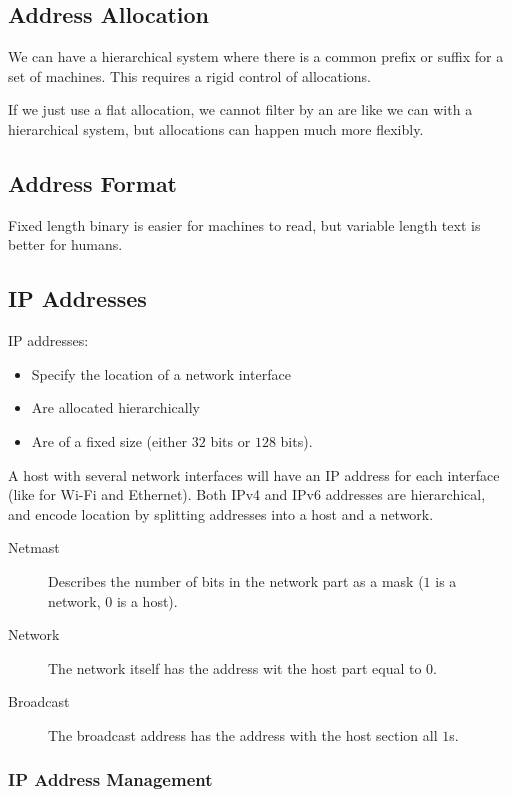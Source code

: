 \subsection{Address Allocation}\label{sub:address_allocation}

We can have a hierarchical system where there is a common prefix or suffix for a set of machines.
This requires a rigid control of allocations.

If we just use a flat allocation, we cannot filter by an are like we can with a hierarchical system, but allocations can happen much more flexibly.

\subsection{Address Format}\label{sub:address_format}

Fixed length binary is easier for machines to read, but variable length text is better for humans.

\subsection{IP Addresses}\label{sub:ip_addresses}

IP addresses:
\begin{itemize}
    \item Specify the location of a network interface
    \item Are allocated hierarchically
    \item Are of a fixed size (either \(32\) bits or \(128\) bits).
\end{itemize}
A host with several network interfaces will have an IP address for each interface (like for Wi-Fi and Ethernet).
Both IPv4 and IPv6 addresses are hierarchical, and encode location by splitting addresses into a host and a network.
\begin{description}
    \item[Netmast] Describes the number of bits in the network part as a mask (\(1\) is a network,  \(0\) is a host).
    \item[Network] The network itself has the address wit the host part equal to \(0\).
    \item[Broadcast] The broadcast address has the address with the host section all \(1\)s.
\end{description}

\subsubsection{IP Address Management}\label{ssub:ip_address_management}

